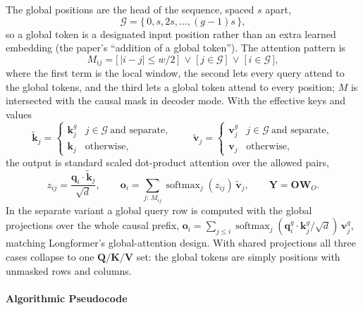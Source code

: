 The global positions are the head of the sequence, spaced $s$ apart,
\[
\mathcal{G} = \{\,0, s, 2s, \dots, (g-1)s\,\},
\]
so a global token is a designated input position rather than an extra learned embedding (the paper's ``addition of a global token''). The attention pattern is
\[
M_{ij} = \big[\,|i-j| \le w/2\,\big] \;\vee\; \big[\,j \in \mathcal{G}\,\big] \;\vee\; \big[\,i \in \mathcal{G}\,\big],
\]
where the first term is the local window, the second lets every query attend to the global tokens, and the third lets a global token attend to every position; $M$ is intersected with the causal mask in decoder mode. With the effective keys and values
\[
\tilde{\mathbf{k}}_j = \begin{cases} \mathbf{k}^{g}_j & j \in \mathcal{G}\ \text{and separate}, \\ \mathbf{k}_j & \text{otherwise}, \end{cases}
\qquad
\tilde{\mathbf{v}}_j = \begin{cases} \mathbf{v}^{g}_j & j \in \mathcal{G}\ \text{and separate}, \\ \mathbf{v}_j & \text{otherwise}, \end{cases}
\]
the output is standard scaled dot-product attention over the allowed pairs,
\[
z_{ij} = \frac{\mathbf{q}_i \cdot \tilde{\mathbf{k}}_j}{\sqrt{d}}, \qquad
\mathbf{o}_i = \sum_{j:\,M_{ij}} \operatorname{softmax}_j(z_{ij})\,\tilde{\mathbf{v}}_j, \qquad
\mathbf{Y} = \mathbf{O}\mathbf{W}_O .
\]
In the separate variant a global query row is computed with the global projections over the whole causal prefix, $\mathbf{o}_i = \sum_{j \le i} \operatorname{softmax}_j(\mathbf{q}^{g}_i \cdot \mathbf{k}^{g}_j/\sqrt{d})\,\mathbf{v}^{g}_j$, matching Longformer's global-attention design. With shared projections all three cases collapse to one $\mathbf{Q}/\mathbf{K}/\mathbf{V}$ set: the global tokens are simply positions with unmasked rows and columns.

\paragraph{Algorithmic Pseudocode}

